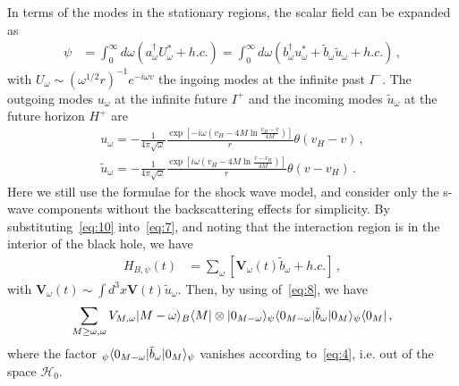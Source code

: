 \documentclass[12pt,a4paper]{article}
\begin{document}
In terms of the modes in the stationary regions, the scalar field can be expanded as
\begin{equation}
\label{eq:9}
\begin{split}
\psi &=  \int_{0}^{\infty}
d\omega(a_{\omega}^{\dag}U_{\omega}^*+h.c.) = \int_{0}^{\infty}
d\omega(b_{\omega}^{\dag}u_{\omega}^*+\tilde{b}_{\omega}\tilde{u}_{\omega}+h.c.)
\,,
\end{split}
\end{equation}
with $U_{\omega}\sim (\omega^{1/2}r)^{-1}e^{-i\omega v}$ the ingoing modes at the infinite past $I^-$. The outgoing modes
$u_{\omega}$ at the infinite future $I^+$ and the incoming modes $\tilde{u}_{\omega}$ at the
future horizon $H^+$ are~\cite{j}
\begin{subequations}\label{eq:10}
\begin{align}
\label{eq:10:1} u_{\omega}=
-\frac{1}{4\pi\sqrt{\omega}}\frac{\exp[-i\omega(v_H-4M\ln\frac{v_H-v}{4M})]}{r}\theta(v_H-v)
\,,
\\
\label{eq:10:2}
\tilde{u}_{\omega}=-\frac{1}{4\pi\sqrt{\omega}}\frac{\exp[i\omega(v_H-4M\ln\frac{v-v_H}{4M})]}{r}\theta(v-v_H)
\,.
\end{align}
\end{subequations}
Here we still use the formulae for the shock wave model, and consider only
the s-wave components without the backscattering effects for simplicity. By substituting~\eqref{eq:10} into~\eqref{eq:7}, and noting that the
interaction region is in the interior of the black hole, we have
\begin{equation}
\label{eq:11}
\begin{split}
H_{B,\psi}(t) &= \sum_{\omega}[\mathbf{V}_{\omega}(t)\tilde{b}_{\omega}+h.c.] \,,
\end{split}
\end{equation}
with $\mathbf{V}_{\omega}(t)\sim \int
d^3x\mathbf{V}(t)\tilde{u}_{\omega}$. Then, by using of~\eqref{eq:8}, we have
\begin{equation}
\label{eq:12}
\begin{split}
\sum_{M\geq\omega,\omega}V_{M,\omega}\arrowvert
M-\omega\rangle_B\langle
M|\otimes\arrowvert0_{M-\omega}\rangle_{\psi}\langle0_{M-\omega}\arrowvert\tilde{b}_{\omega}\arrowvert0_M\rangle_{\psi}\langle0_M\arrowvert
\,,
\end{split}
\end{equation}
where the factor
$_{\psi}\langle0_{M-\omega}\arrowvert\tilde{b}_{\omega}\arrowvert0_M\rangle_{\psi}$
vanishes according to~\eqref{eq:4}, i.e. out of the space $\mathcal {H}_0$.
\end{document}
